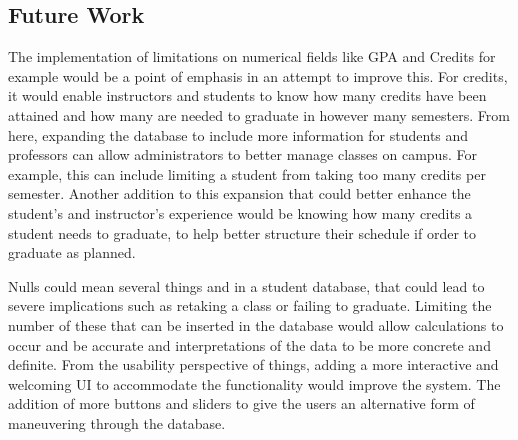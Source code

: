 \documentclass[12pt]{article}
\begin{document}
\subsection{Future Work}

The implementation of limitations on numerical fields like GPA and Credits for example would be a point of emphasis in an attempt to improve this. For credits, it would enable instructors and students to know how many credits have been attained and how many are needed to graduate in however many semesters. From here, expanding the database to include more information for students and professors can allow administrators to better manage classes on campus. For example, this can include limiting a student from taking too many credits per semester. Another addition to this expansion that could better enhance the student’s and instructor’s experience would be knowing how many credits a student needs to graduate, to help better structure their schedule if order to graduate as planned.

Nulls could mean several things and in a student database, that could lead to severe implications such as retaking a class or failing to graduate.  Limiting the number of these that can be inserted in the database would allow calculations to occur and be accurate and interpretations of the data to be more concrete and definite. From the usability perspective of things, adding a more interactive and welcoming UI to accommodate the functionality would improve the system. The addition of more buttons and sliders to give the users an alternative form of maneuvering through the database.

%
%
\end{document}
